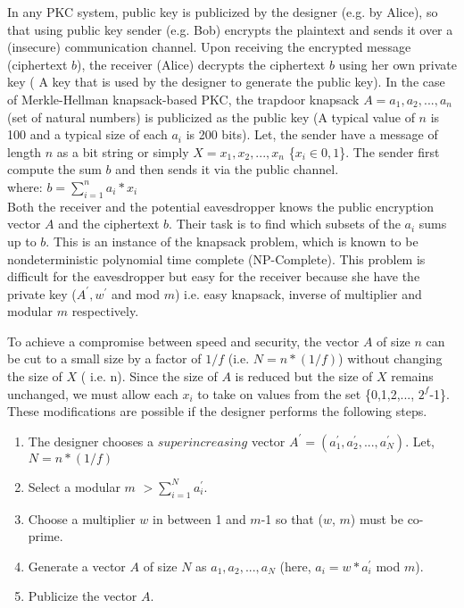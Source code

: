 \documentclass[5p,times,twocolumn]{elsarticle}
\begin{document}
In any PKC system, public key is publicized by the designer (e.g. by Alice), so that using public key sender (e.g. Bob) encrypts the plaintext and sends it over a  (insecure) communication  channel. Upon receiving the encrypted message (ciphertext $b$), the receiver (Alice) decrypts the ciphertext $b$ using her own private key ( A key that is used by the designer to generate the public key). In the case of Merkle-Hellman knapsack-based PKC, the trapdoor knapsack $A=a_1, a_2,..., a_n$ (set of natural numbers) is publicized as the public key (A typical value of $n$ is 100 and a typical size of each $a_i$ is 200 bits). Let, the sender have a message of length $n$ as a bit string or simply $X = x_1, x_2,..., x_n$ \{$x_{i} \in{0,1}$\}. The sender first compute the sum $b$ and then sends it via the public channel. \\

where: $b =\sum_{i=1}^n a_{i}*x_{i}$\\

Both the receiver and the potential eavesdropper knows the public encryption vector $A$ and the ciphertext $b$. Their task is to find which subsets of the $a_{i}$  sums up to $b$. This is an instance of the knapsack problem, which is known to be nondeterministic polynomial time complete (NP-Complete). This problem is difficult for the eavesdropper but easy for the receiver because she have the private key ($A^{'}, w^{'}$ and mod $m$) i.e. easy knapsack, inverse of multiplier and modular $m$ respectively.  

To achieve a compromise between speed and security, the vector $A$ of size $n$ can be cut to a small size by a factor of $1/f$ (i.e. $N=n*(1/f)$) without changing the size of $X$ ( i.e. n). Since the size of $A$ is reduced but the size of $X$ remains unchanged, we must allow each $x_{i}$ to take on values from the set \{0,1,2,..., $2^{f}$-1\}. These modifications are possible if the designer performs the following steps.\\

\begin{enumerate}
  	\item The designer chooses a $superincreasing$ vector $A^{'}= (a^{'}_{1}, a^{'}_{2},..., a^{'}_{N})$. Let, $N=n*(1/f)$
	\item Select a modular $m$ $>\sum_{i=1}^{N} a^{'}_i$.	
	\item Choose a multiplier $w$ in between 1 and $m$-1 so that ($w$, $m$) must be co-prime.
	\item Generate a vector $A$ of size $N$ as $a_1, a_2,..., a_N$ (here, $a_i=w*a^{'}_i$ mod  $m$).
	\item Publicize the vector $A$.	
\end{enumerate}
\end{document}
